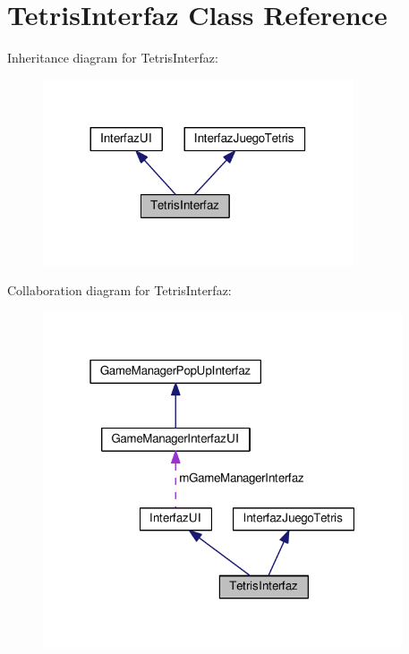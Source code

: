 \hypertarget{class_tetris_interfaz}{}\section{Tetris\+Interfaz Class Reference}
\label{class_tetris_interfaz}


Inheritance diagram for Tetris\+Interfaz\+:
\nopagebreak
\begin{figure}[H]
\begin{center}
\leavevmode
\includegraphics[width=260pt]{class_tetris_interfaz__inherit__graph}
\end{center}
\end{figure}


Collaboration diagram for Tetris\+Interfaz\+:
\nopagebreak
\begin{figure}[H]
\begin{center}
\leavevmode
\includegraphics[width=301pt]{class_tetris_interfaz__coll__graph}
\end{center}
\end{figure}
